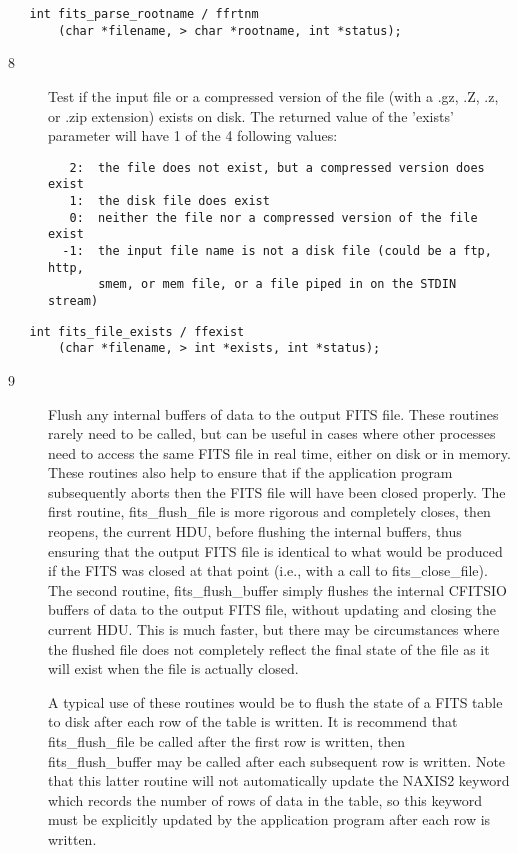 \documentclass[11pt]{book}
\begin{document}
\begin{verbatim}
   int fits_parse_rootname / ffrtnm
       (char *filename, > char *rootname, int *status);
\end{verbatim}

\begin{description}
\item[8 ]Test if the input file or a compressed version of the file (with
a .gz, .Z, .z, or .zip extension) exists on disk.  The returned value of
the 'exists' parameter will have 1 of the 4 following values:

\begin{verbatim}
   2:  the file does not exist, but a compressed version does exist
   1:  the disk file does exist
   0:  neither the file nor a compressed version of the file exist
  -1:  the input file name is not a disk file (could be a ftp, http,
       smem, or mem file, or a file piped in on the STDIN stream)
\end{verbatim}

 \label{ffexist}
\end{description}

\begin{verbatim}
   int fits_file_exists / ffexist
       (char *filename, > int *exists, int *status);
\end{verbatim}

\begin{description}
\item[9 ]Flush any internal buffers of data to the output FITS file. These
   routines rarely need to be called, but can be useful in cases where
   other processes need to access the same FITS file in real time,
   either on disk or in memory.  These routines also help to ensure
   that if the application program subsequently aborts then the FITS
   file will have been closed properly.  The first routine,
   fits\_flush\_file is more rigorous and completely closes, then
   reopens, the current HDU, before flushing the internal buffers, thus
   ensuring that the output FITS file is identical to what would be
   produced if the FITS was closed at that point (i.e., with a call to
   fits\_close\_file).  The second routine, fits\_flush\_buffer simply
   flushes the internal CFITSIO buffers of data to the output FITS
   file, without updating and closing the current HDU.  This is much
   faster, but there may be circumstances where the flushed file does
   not completely reflect the final state of the file as it will exist
   when the file is actually closed.

   A typical use of these routines would be to flush the state of a
   FITS table to disk after each row of the table is written.  It is
   recommend that fits\_flush\_file be called after the first row is
   written, then fits\_flush\_buffer may be called after each
   subsequent row is written.  Note that this latter routine will not
   automatically update the NAXIS2 keyword which records the number of
   rows of data in the table, so this keyword must be explicitly
   updated by the application program after each row is written.
  \label{ffflus}
\end{description}
\end{document}
